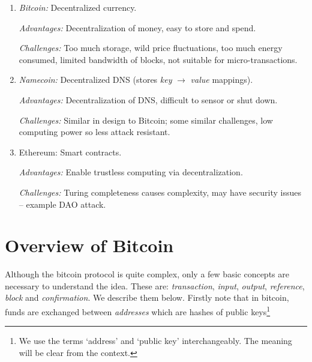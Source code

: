 \documentclass[]{report}   %
\begin{document}
%
\begin{enumerate}
	\item {\em Bitcoin:} Decentralized currency. 
	
		{\em Advantages:} Decentralization of money, easy to store and spend.
		
		{\em Challenges:} Too much storage, wild price fluctuations, too much energy consumed, limited bandwidth of blocks, not suitable for micro-transactions.
	\item {\em Namecoin:} Decentralized DNS (stores {\em key} $\rightarrow$ {\em value} mappings). 

		{\em Advantages:} Decentralization of DNS, difficult to sensor or shut down.
		
		{\em Challenges:} Similar in design to Bitcoin; some similar challenges, low computing power so less attack resistant.
	
	\item {Ethereum:} Smart	contracts.
	
	  {\em Advantages:} Enable trustless computing via decentralization.		
		
		{\em Challenges:} Turing completeness causes complexity, may have security issues -- example DAO attack.
	
\end{enumerate}
%
%

\chapter{Overview of Bitcoin}

Although the bitcoin protocol is quite complex, only a few basic concepts are necessary to understand the idea. These are: {\em transaction}, {\em input}, {\em output}, {\em reference}, {\em block} and {\em confirmation}. We describe them below. Firstly note that in bitcoin, funds are exchanged between {\em addresses} which are %
hashes of public keys\footnote{We use the terms `address' and `public key' interchangeably. The meaning will be clear from the context.} %
\end{document}
